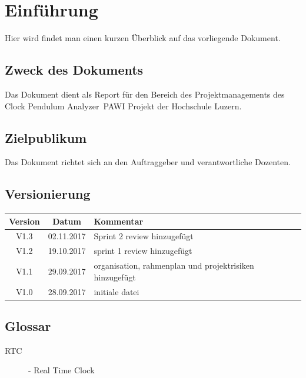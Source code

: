 \documentclass[a4paper, 10pt, fleqn]{article}
\newcommand{\documenttitle}{Clock Pendulum Analyzer} %
\begin{document}
	\begin{titlepage}
		\titleGM
		\thispagestyle{empty}
	\end{titlepage}
	
	\tableofcontents
	\listoffigures
	\listoftables
	
	\clearpage
	\section{Einführung}
        Hier wird findet man einen kurzen Überblick auf das vorliegende Dokument.
		\subsection{Zweck des Dokuments}
        Das Dokument dient als Report für den Bereich des Projektmanagements des \documenttitle\ PAWI Projekt der Hochschule Luzern.
		\subsection{Zielpublikum}
        Das Dokument richtet sich an den Auftraggeber und verantwortliche Dozenten.
		\subsection{Versionierung}
			\begin{table}[h]
				\centering
				\begin{tabularx}{\textwidth}{|c|c|X|}
				\hline
				\rowcolor{shadecolor}\textbf{Version} & \textbf{Datum} & \textbf{Kommentar}\\ \hline
                V1.3 & 02.11.2017 & Sprint 2 review hinzugefügt\\
                V1.2 & 19.10.2017 & sprint 1 review hinzugefügt\\
                V1.1 & 29.09.2017 & organisation, rahmenplan und projektrisiken hinzugefügt\\
				V1.0 & 28.09.2017 & initiale datei \\ \hline
				\end{tabularx}
			\end{table}
		\subsection{Glossar}
			\begin{description}
				\item[RTC]- Real Time Clock
			\end{description}
\end{document}
